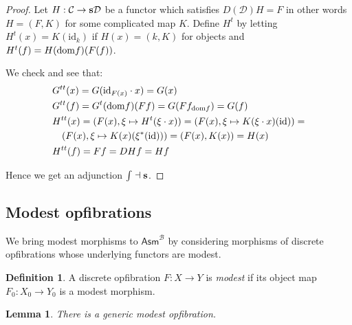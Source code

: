\documentclass{amsart}
\theoremstyle{plain}
\newtheorem{lemma}[theorem]{Lemma}
\theoremstyle{definition}
\newtheorem{defin}[theorem]{Definition}
\newcommand\hide[1]{}
\newcommand\cat\mathcal
\newcommand\id{\mathrm{id}}
\newcommand\ri{^*}
\newcommand\Asm{\mathsf{Asm}}
\begin{document}
\begin{proof}
{Let $H:\cat C\to \rat\cat D$ be a functor which satisfies $D(\cat D) H = F$ in other words $H = (F,K)$ for some complicated map $K$. Define $H^t$ by letting $H^t(x) = K(\id_k)$ if $H(x) = (k,K)$ for objects and $H^t(f) = H(\mathrm{dom} f)(F(f))$.

We check and see that:
\begin{align*}
& G^{tt}(x) = G(\id_{F(x)}\cdot x) = G(x)\\ %
& G^{tt}(f) = G^t(\dom f)(Ff) = G(Ff_{\dom f}) = G(f) \\ %
& H^{tt}(x) = (F(x), \xi\mapsto H^t(\xi\cdot x)) = (F(x), \xi\mapsto K(\xi\cdot x)(\id)) =\\
&\quad (F(x), \xi \mapsto K(x)(\xi\ri(\id))) = (F(x), K(x)) = H(x)\\ %
& H^{tt}(f) = Ff = DHf = Hf\\%
\end{align*}}

Hence we get an adjunction $\mathord{\int}\dashv\mathbf{s}$.
\end{proof}

\hide{zo komen we er moet een hoop gepuzzel toch. Godverdomme wat een gedoe zeg!}
\subsection{Modest opfibrations}
We bring modest morphisms to $\Asm^{\cat B}$ by considering morphisms of discrete opfibrations whose underlying functors are modest.

\begin{defin} A discrete opfibration $F:X\to Y$ is \emph{modest} if its object map $F_0:X_0\to Y_0$ is a modest morphism. \end{defin}

\begin{lemma} There is a generic modest opfibration. \end{lemma}
\end{document}
